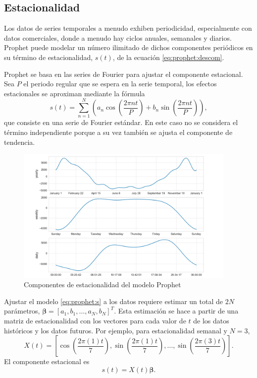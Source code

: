 \documentclass[12pt,twoside]{article}
\begin{document}
\subsection{Estacionalidad}
Los datos de series temporales a menudo exhiben periodicidad, especialmente con datos comerciales, donde a menudo hay ciclos anuales, semanales y diarios. Prophet puede modelar un número ilimitado de dichos componentes periódicos en su término de estacionalidad, $s(t)$, de la ecuación \eqref{eq:prophet:descom}.

Prophet se basa en las series de Fourier para ajustar el componente estacional. Sea $P$ el periodo regular que se espera en la serie temporal, los efectos estacionales se aproximan mediante la fórmula
\begin{equation}\label{eq:prophet:s}
    s(t) = \sum_{n=1}^N \left( a_n\cos{\left(\frac{2\pi n t}{P}\right)} + b_n \sin{\left(\frac{2 \pi n t}{P}\right)}\right),
\end{equation}
que consiste en una serie de Fourier estándar. En este caso no se considera el término independiente porque a su vez también se ajusta el componente de tendencia.

\begin{figure}[h]
\centering
    \includegraphics[width = 0.95\textwidth]{imagenes/prophet_comp.png}
    \caption{Componentes de estacionalidad del modelo Prophet}\label{fig:prophet_comp}
\end{figure}


Ajustar el modelo \eqref{eq:prophet:s} a los datos requiere estimar un total de $2N$ parámetros, $\boldsymbol{\beta} = [a_1, b_1, \dotsc, a_N, b_N]^T$. Esta estimación se hace a partir de una matriz de estacionalidad con los vectores para cada valor de $t$ de los datos históricos y los datos futuros. Por ejemplo, para estacionalidad semanal y $N=3$, 
\begin{equation*}
    X(t) = \left[ \cos{\left(\frac{2\pi (1)t}{7}\right)} , \sin{\left( \frac{2\pi(1)t}{7}\right)},  \dotsc, \sin{\left( \frac{2\pi(3)t}{7}\right)}  \right].
\end{equation*}
El componente estacional es
\begin{equation}\label{eq:prophet:s2}
    s(t) = X(t) \boldsymbol{\beta}.
\end{equation}
\end{document}
